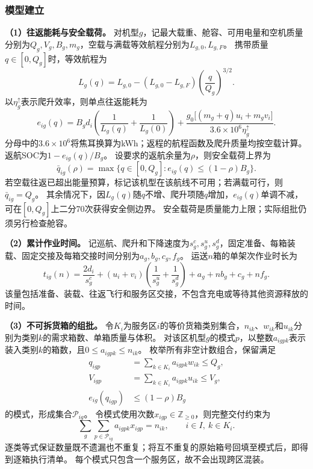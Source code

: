 \subsubsection{模型建立}
\label{sec:q1:formulation}

\textbf{（1）往返能耗与安全载荷。}
对机型$g$，记最大载重、舱容、可用电量和空机质量分别为$Q_g,V_g,B_g,m_g$，空载与满载等效航程分别为$L_{g,0},L_{g,F}$。
携带质量$q\in[0,Q_g]$时，等效航程为
\begin{equation}
 L_g(q)=L_{g,0}-(L_{g,0}-L_{g,F})\left(\frac{q}{Q_g}\right)^{3/2}.
 \label{eq:q1:range}
\end{equation}
以$\eta_g^{\uparrow}$表示爬升效率，则单点往返能耗为
\begin{equation}
 e_{ig}(q)=B_gd_i\left(\frac{1}{L_g(q)}+\frac{1}{L_g(0)}\right)
 +\frac{g_0\big[(m_g+q)u_i+m_gv_i\big]}{3.6\times10^6\eta_g^{\uparrow}}.
 \label{eq:q1:energy}
\end{equation}
分母中的$3.6\times10^6$将焦耳换算为kWh；返程的航程函数及爬升质量均按空载计算。
返航SOC为$1-e_{ig}(q)/B_g$。
设要求的返航余量为$\rho$，则安全载荷上界为
\begin{equation}
 \bar q_{ig}(\rho)=\max\{q\in[0,Q_g]:e_{ig}(q)\le(1-\rho)B_g\}.
 \label{eq:q1:payload}
\end{equation}
若空载往返已超出能量预算，标记该机型在该航线不可用；若满载可行，则$\bar q_{ig}=Q_g$。
其余情况下，因$L_g(q)$随$q$不增、爬升项随$q$增加，$e_{ig}(q)$单调不减，可在$[0,Q_g]$上二分70次获得安全侧边界。
安全载荷是质量能力上限；实际组批仍须另行检查舱容。

\textbf{（2）累计作业时间。}
记巡航、爬升和下降速度为$s_g^c,s_g^u,s_g^d$，固定准备、每箱装载、固定交接及每箱交接时间分别为$a_g,b_g,c_g,f_g$。
运送$n$箱的单架次作业时长为
\begin{equation}
 t_{ig}(n)=\frac{2d_i}{s_g^c}+(u_i+v_i)\left(\frac{1}{s_g^u}+\frac{1}{s_g^d}\right)
 +a_g+nb_g+c_g+nf_g.
 \label{eq:q1:time}
\end{equation}
该量包括准备、装载、往返飞行和服务区交接，不包含充电或等待其他资源释放的时间。

\textbf{（3）不可拆货箱的组批。}
令$K_i$为服务区$i$的等价货箱类别集合，$n_{ik}$、$w_{ik}$和$u_{ik}$分别为类别$k$的需求箱数、单箱质量与体积。
对该区机型$g$的模式$p$，以整数$a_{igpk}$表示装入类别$k$的箱数，且$0\le a_{igpk}\le n_{ik}$。
枚举所有非空计数组合，保留满足
\begin{equation}
 \begin{aligned}
 q_{igp}&=\sum_{k\in K_i}a_{igpk}w_{ik}\le Q_g,\\
 V_{igp}&=\sum_{k\in K_i}a_{igpk}u_{ik}\le V_g,\\
 e_{ig}(q_{igp})&\le(1-\rho)B_g
 \end{aligned}
 \label{eq:q1:pattern}
\end{equation}
的模式，形成集合$\mathcal P_{ig}$。
令模式使用次数$x_{igp}\in\mathbb Z_{\ge0}$，则完整交付约束为
\begin{equation}
 \sum_g\sum_{p\in\mathcal P_{ig}}a_{igpk}x_{igp}=n_{ik},
 \qquad i\in I,\ k\in K_i.
 \label{eq:q1:cover}
\end{equation}
逐类等式保证数量既不遗漏也不重复；将互不重复的原始箱号回填至模式后，即得到逐箱执行清单。
每个模式只包含一个服务区，故不会出现跨区混装。

